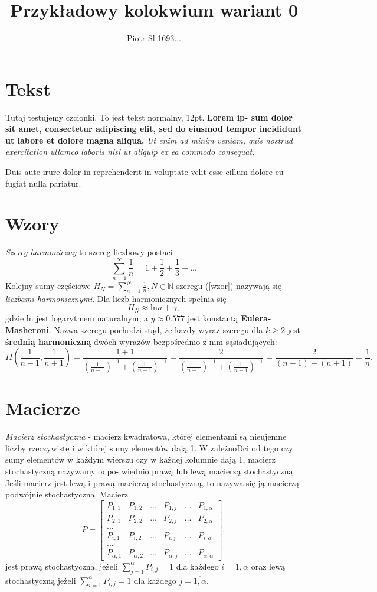 \documentclass[a4paper,11pt]{amsart}
\author{Piotr Sl 1693...}
\title{Przykładowy kolokwium wariant 0}
\begin{document}
\maketitle
\tableofcontents
\section{Tekst}
Tutaj testujemy czcionki. To jest tekst normalny, 12pt. \textbf{Lorem ip-
sum dolor sit amet, consectetur adipiscing elit, sed do eiusmod
tempor incididunt ut labore et dolore magna aliqua.} 
\textit{Ut enim ad
minim veniam, quis nostrud exercitation ullamco laboris nisi ut aliquip
ex ea commodo consequat.} 
\begin{Huge}Duis aute irure dolor in
reprehenderit in voluptate velit esse
cillum dolore eu fugiat nulla pariatur.
\end{Huge}
\section{Wzory}
\emph{Szereg harmoniczny} to szereg liczbowy postaci
\begin{equation}\label{wzor}
\displaystyle\sum^\infty_{n=1}\frac{1}{n}=1+\frac{1}{2}+\frac{1}{3}+...
\end{equation}
Kolejny sumy częściowe 
$H_N=\displaystyle\sum^N_{n=1}\frac{1}{n}, N \in \mathbb{N}$ 
szeregu (\ref{wzor}) nazywają się \emph{liczbami harmonicznymi}. 
Dla liczb harmonicznych spełnia się
$$H_N\approx \textrm{ln}  n + \gamma,$$
gdzie ln jest logarytmem naturalnym, a $y \approx 0.577$ jest konstantą
\textbf{Eulera-Masheroni}.  \newpage
Nazwa szeregu pochodzi stąd, że każdy wyraz szeregu dla $k\geq 2$ jest \textbf{średnią harmoniczną} dwóch wyrazów bezpośrednio z nim sąsiadujących:
$$II(\frac{1}{n-1},\frac{1}{n+1})=\frac{1+1}{(\frac{1}{n-1})^{-1}+(\frac{1}{n+1})^{-1}}=\frac{2}{(\frac{1}{n-1})^{-1}+(\frac{1}{n+1})^{-1}}
=\frac{2}{(n-1)+(n+1)}=\frac{1}{n}.$$
\section{Macierze}
\emph{Macierz stochastyczna} - macierz kwadratowa, której elementami 
są nieujemne liczby rzeczywiste i w której sumy elementów
dają 1. W zależnoDci od tego czy sumy elementów w każdym wierszu
czy w każdej kolumnie dają 1, macierz stochastyczną nazywamy odpo-
wiednio prawą lub lewą macierzą stochastyczną. Jeśli macierz jest lewą
i prawą macierzą stochastyczną, to nazywa się ją macierzą podwójnie
stochastyczną. Macierz
$$P=
\begin{bmatrix}
P_{1,1}&P_{1,2}&...&P_{1,j}&...&P_{1,\alpha}\\
P_{2,1}&P_{2,2}&...&P_{2,j}&...&P_{2,\alpha}\\
...\\
P_{i,1}&P_{i,2}&...&P_{i,j}&...&P_{i,\alpha}\\
...\\
P_{\alpha,1}&P_{\alpha,2}&...&P_{\alpha,j}&...&P_{\alpha,\alpha}
\end{bmatrix},$$
jest prawą stochastyczną, jeżeli $\sum^\alpha_{j=1}P_{i,j}=1$ dla każdego $i=\overline{1,\alpha}$ oraz \newline
lewą stochastyczną jeżeli $\sum^\alpha_{i=1}P_{i,j}=1$ dla każdego $j=\overline{1,\alpha}.$
\end{document}
